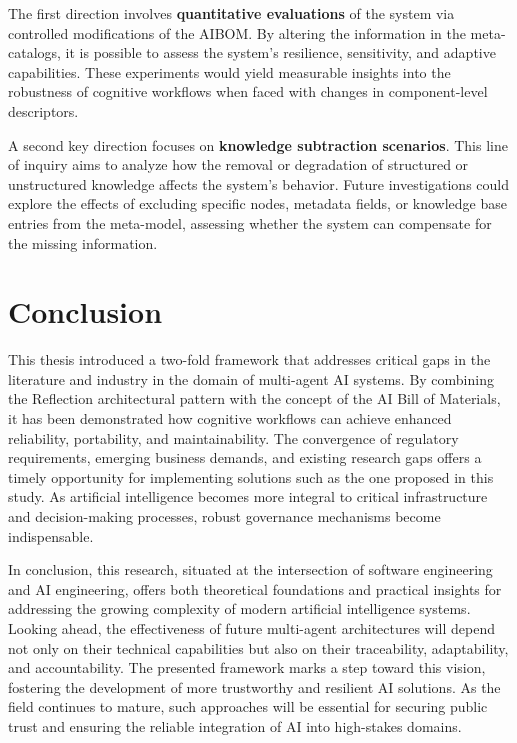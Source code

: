 The first direction involves \textbf{quantitative evaluations} of the system via controlled modifications of the AIBOM. By altering the information in the meta-catalogs, it is possible to assess the system's resilience, sensitivity, and adaptive capabilities. These experiments would yield measurable insights into the robustness of cognitive workflows when faced with changes in component-level descriptors.

A second key direction focuses on \textbf{knowledge subtraction scenarios}. This line of inquiry aims to analyze how the removal or degradation of structured or unstructured knowledge affects the system's behavior. Future investigations could explore the effects of excluding specific nodes, metadata fields, or knowledge base entries from the meta-model, assessing whether the system can compensate for the missing information.




\section{Conclusion} \label{sec:conclusion}
This thesis introduced a two-fold framework that addresses critical gaps in the literature and industry in the domain of multi-agent AI systems. By combining the Reflection architectural pattern with the concept of the AI Bill of Materials, it has been demonstrated how cognitive workflows can achieve enhanced reliability, portability, and maintainability. The convergence of regulatory requirements,  emerging business demands, and existing research gaps offers a timely opportunity for implementing solutions such as the one proposed in this study. As artificial intelligence becomes more integral to critical infrastructure and decision-making processes, robust governance mechanisms become indispensable. 

In conclusion, this research, situated at the intersection of software engineering and AI engineering, offers both theoretical foundations and practical insights for addressing the growing complexity of modern artificial intelligence systems. Looking ahead, the effectiveness of future multi-agent architectures will depend not only on their technical capabilities but also on their traceability, adaptability, and accountability. The presented framework marks a step toward this vision, fostering the development of more trustworthy and resilient AI solutions. As the field continues to mature, such approaches will be essential for securing public trust and ensuring the reliable integration of AI into high-stakes domains.



